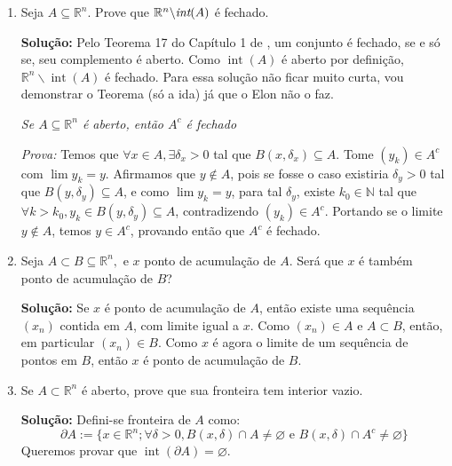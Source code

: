 \documentclass[12pt]{article}
\newcommand{\N}{\mathbb{N}}
\newcommand{\emp}{\varnothing}
\newcommand{\rn}{\mathbb{R}^n}
\newcommand{\op}[1]{\operatorname{#1}}
\begin{document}
\begin{enumerate}
\item Seja $A\subseteq \mathbb{R}^n.$ Prove que $\mathbb{R}^n\backslash \emph{int} (A)$ \'e fechado.

\textbf{Solução:} Pelo Teorema 17 do Capítulo 1 de \cite{analise2}, um conjunto é fechado, se e só se, seu complemento é aberto. Como $\op{int}(A)$ é aberto por definição, $\rn\backslash\op{int}(A)$ é fechado. Para essa solução não ficar muito curta, vou demonstrar o Teorema (só a ida) já que o Elon não o faz.

\textit{Se $A\subseteq\rn$ é aberto, então $A^c$ é fechado}

\textit{Prova:} Temos que $\forall x \in A, \exists\delta_x>0$ tal que $B(x,\delta_x)\subseteq A$. Tome $(y_k)\in A^c$ com $\lim y_k=y$. Afirmamos que $y\notin A$, pois se fosse o caso existiria $\delta_y>0$ tal que $B(y,\delta_y)\subseteq A$, e como $\lim y_k=y$, para tal $\delta_y$, existe $k_0\in\N$ tal que $\forall k>k_0, y_k\in B(y,\delta_y)\subseteq A$, contradizendo $(y_k)\in A^c$. Portando se o limite $y\notin A$, temos $y\in A^c$, provando então que $A^c$ é fechado.


\item Seja $A\subset B \subseteq \mathbb{R}^n,$ e $x$ ponto de acumula\c{c}\~ao de $A$. Ser\'a que $x$ \'e tamb\'em ponto de acumula\c{c}\~ao de $B$?

\textbf{Solução:} Se $x$ é ponto de acumulação de $A$, então existe uma sequência $(x_n)$ contida em $A$, com limite igual a $x$. Como $(x_n)\in A$ e $A\subset B$, então, em particular $(x_n)\in B$. Como $x$ é agora o limite de um sequência de pontos em $B$, então $x$ é ponto de acumulação de $B$.


\item Se $A\subset \mathbb{R}^n$ \'e aberto, prove que sua fronteira tem interior vazio. 

\textbf{Solução:} Defini-se fronteira de $A$ como:
$$\partial A:=\{x\in\rn;\forall\delta>0,B(x,\delta)\cap A\neq\emp\text{ e }B(x,\delta)\cap A^c\neq\emp\}$$
Queremos provar que $\op{int}(\partial A)=\emp$.


\end{enumerate}
\end{document}
